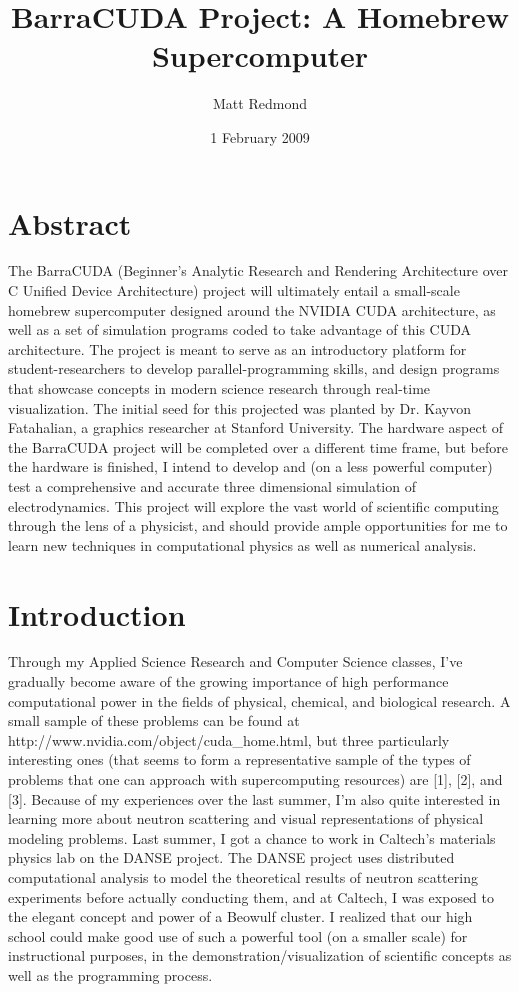 \documentclass[10pt]{article}
\title{BarraCUDA Project: A Homebrew Supercomputer}  %
\author{Matt Redmond}      %
\date{1 February 2009}
\begin{document}
\maketitle
\tableofcontents
\clearpage

\section{Abstract}
The BarraCUDA (Beginner's Analytic Research and Rendering Architecture over C Unified Device Architecture) project will ultimately entail a small-scale homebrew supercomputer designed around the NVIDIA CUDA architecture, as well as a set of simulation programs coded to take advantage of this CUDA architecture. The project is meant to serve as an introductory platform for student-researchers to develop parallel-programming skills, and design programs that showcase concepts in modern science research through real-time visualization. The initial seed for this projected was planted by Dr. Kayvon Fatahalian, a graphics researcher at Stanford University. The hardware aspect of the BarraCUDA project will be completed over a different time frame, but before the hardware is finished, I intend to develop and (on a less powerful computer) test a comprehensive and accurate three dimensional simulation of electrodynamics. This project will explore the vast world of scientific computing through the lens of a physicist, and should provide ample opportunities for me to learn new techniques in computational physics as well as numerical analysis.

\section{Introduction} %
Through my Applied Science Research and Computer Science classes, I've gradually become aware of the growing importance of high performance computational power in the fields of physical, chemical, and biological research. A small sample of these problems can be found at http://www.nvidia.com/object/cuda_home.html, but three particularly interesting ones (that seems to form a representative sample of the types of problems that one can approach with supercomputing resources) are [1], [2], and [3]. Because of my experiences over the last summer, I'm also quite interested in learning more about neutron scattering and visual representations of physical modeling problems. Last summer, I got a chance to work in Caltech's materials physics lab on the DANSE project. The DANSE project uses distributed computational analysis to model the theoretical results of neutron scattering experiments before actually conducting them, and at Caltech, I was exposed to the elegant concept and power of a Beowulf cluster. I realized that our high school could make good use of such a powerful tool (on a smaller scale) for instructional purposes, in the demonstration/visualization of scientific concepts as well as the programming process.
\end{document}
